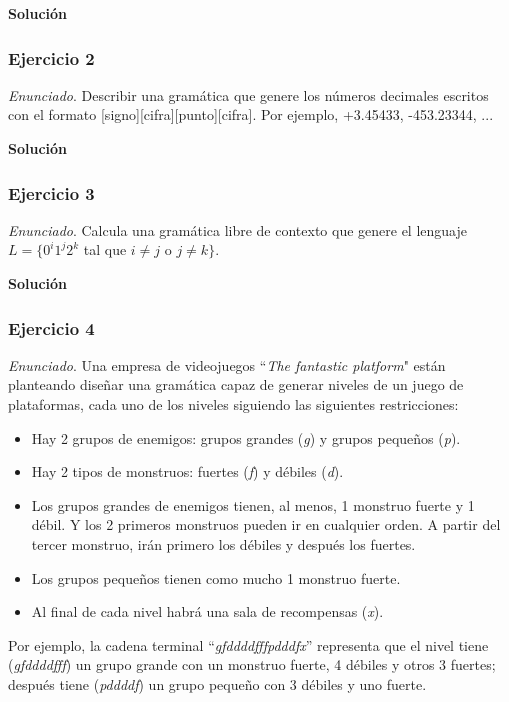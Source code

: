 \documentclass[11pt,a4paper]{article}
\newcommand{\enu}{\textit{Enunciado}}
\newcommand{\sol}{\textbf{Solución}}
\begin{document}
		\sol
		
		\subsubsection{Ejercicio 2}
		\enu. Describir una gramática que genere los números decimales escritos con el formato
		[signo][cifra][punto][cifra]. Por ejemplo, +3.45433, -453.23344, ...\par

		\sol
		
		 
		
		\subsubsection{Ejercicio 3}
		\enu. Calcula una gramática libre de contexto que genere el lenguaje
		$L = \lbrace 0^i 1^j 2^k$
		tal que
		$i \neq j$ o $j \neq k \rbrace$. \par
		
		\sol
		
		\subsubsection{Ejercicio 4}
		\enu. Una empresa de videojuegos ``\textit{The fantastic platform}" están planteando diseñar
		una gramática capaz de generar niveles de un juego de plataformas, cada uno de los niveles
		siguiendo las siguientes restricciones:
		
		\begin{itemize}[noitemsep]
			\item Hay 2 grupos de enemigos: grupos grandes (\textit{g}) y grupos pequeños (\textit{p}).
			\item Hay 2 tipos de monstruos: fuertes (\textit{f}) y débiles (\textit{d}).
			\item Los grupos grandes de enemigos tienen, al menos, 1 monstruo fuerte y 1 débil.
				Y los 2 primeros monstruos pueden ir en cualquier orden. A partir del tercer
				monstruo, irán primero los débiles y después los fuertes.
			\item Los grupos pequeños tienen como mucho 1 monstruo fuerte.
			\item Al final de cada nivel habrá una sala de recompensas (\textit{x}).
		\end{itemize}
	Por ejemplo, la cadena terminal “\textit{gfddddfffpdddfx}” representa que el nivel tiene
	(\textit{gfddddfff}) un grupo grande con un monstruo fuerte, 4 débiles y otros 3 fuertes; 
	después tiene (\textit{pddddf}) un grupo pequeño con 3 débiles y uno fuerte.\\
	
\end{document}
